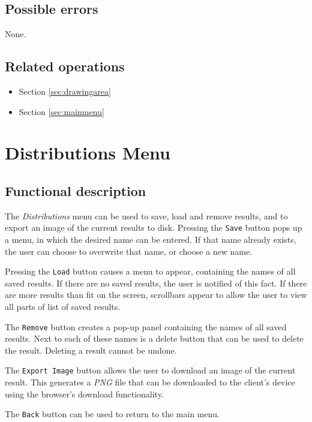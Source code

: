   \subsection*{Possible errors}
  None.

  \subsection*{Related operations}
  \begin{itemize}
  \item Section \ref{sec:drawingarea}
    \item Section \ref{sec:mainmenu}
  \end{itemize}

\section{Distributions Menu}\label{sec:distmenu}
  \subsection*{Functional description}
  The \emph{Distributions} menu can be used to save, load and remove results, and to export an image of the current results to disk. Pressing the \texttt{Save} button pops up a menu, in which the desired name can be entered. If that name already exists, the user can choose to overwrite that name, or choose a new name.
  
  Pressing the \texttt{Load} button causes a menu to appear, containing the names of all saved results. If there are no saved results, the user is notified of this fact. If there are more results than fit on the screen, scrollbars appear to allow the user to view all parts of list of saved results.
  
  The \texttt{Remove} button creates a pop-up panel containing the names of all saved results. Next to each of these names is a delete button that can be used to delete the result. Deleting a result cannot be undone. 
  
  The \texttt{Export Image} button allows the user to download an image of the current result. This generates a \emph{PNG} file that can be downloaded to the client's device using the browser's download functionality.
  
  The \texttt{Back} button can be used to return to the main menu.

